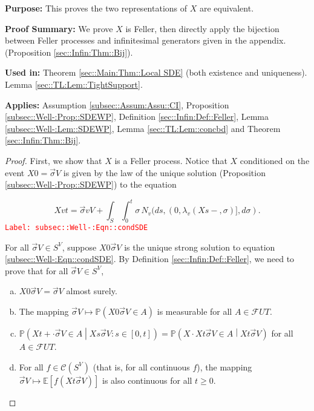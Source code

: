 \documentclass[12pt]{article}
\newcommand{\mb}{\mathbb}
\newcommand{\mc}{\mathcal}
\newcommand{\tr}{\textcolor{red}}
\newcommand{\labe}[1]{\tr{\texttt{Label: #1}}}
\newcommand{\purpose}{\textbf{Purpose: }}
\newcommand{\pfsum}{\textbf{Proof Summary: }}
\newcommand{\usein}{\textbf{Used in: }}
\newcommand{\app}{\textbf{Applies: }}
\newcommand{\pr}{\mb{P}}							%
\newcommand{\ex}[1]{\mb{E}\left[#1\right]}			%
\renewcommand{\v}{v}							%
\renewcommand{\U}{U}							%
\renewcommand{\S}{S}							%
\newcommand{\s}{\sigma}							%
\newcommand{\sv}{\vec{\s}}						%
\newcommand{\T}{T}								%
\renewcommand{\t}{t}							%
\renewcommand{\tt}{s}							%
\newcommand{\F}{\mc{F}}							%
\newcommand{\X}{X}								%
\newcommand{\poiss}[1]{N_{#1}}						%
\newcommand{\V}{V}									%
\newcommand{\XState}[1]{\S^{#1}}				%
\newcommand{\rate}[1]{\lambda_{#1}}					%
\newcommand{\cont}{\mc{C}}							%
\begin{document}
\purpose This proves the two representations of \(\X{}{}\) are equivalent.

\pfsum We prove \(\X{}{}\) is Feller, then directly apply the bijection between Feller processes and infinitesimal generators given in the appendix. (Proposition \ref{sec::Infin:Thm::Bij}).

\usein Theorem \ref{sec::Main:Thm::Local SDE} (both existence and uniqueness). Lemma \ref{sec::TL:Lem::TightSupport}.

\app Assumption \ref{subsec::Assum:Assu::CI}, Proposition \ref{subsec::Well-:Prop::SDEWP}, Definition \ref{sec::Infin:Def::Feller}, Lemma \ref{subsec::Well-:Lem::SDEWP}, Lemma \ref{sec::TL:Lem::concbd} and Theorem \ref{sec::Infin:Thm::Bij}.

\begin{proof}
First, we show that \(\X{}{}\) is a Feller process. Notice that \(\X{}{}\) conditioned on the event \(\X{}{0} = \sv{}{\V}\) is given by the law of the unique solution (Proposition \ref{subsec::Well-:Prop::SDEWP}) to the equation

\begin{equation}
\X{\v}{\t} = \sv{\v}{\V} + \int_\S\int_0^\t \s\,\poiss{\v}(d\tt,(0,\rate{\v}(\X{}{\tt-},\s)],d\s).
\label{subsec::Well-:Eqn::condSDE}
\end{equation}
\labe{subsec::Well-:Eqn::condSDE}

For all \(\sv{}{\V}\in\S^\V\), suppose \(\X{}{0}{\sv{}{\V}}\) is the unique strong solution to equation \eqref{subsec::Well-:Eqn::condSDE}. By Definition \ref{sec::Infin:Def::Feller}, we need to prove that for all \(\sv{}{\V}\in \S^\V\),

\begin{enumerate}[(a)]
\item \(\X{}{0}{\sv{}{\V}} = \sv{}{\V}\) almost surely.

\item The mapping \(\sv{}{\V}\mapsto \pr\left(\X{}{0}{\sv{}{\V}}\in A\right)\) is measurable for all \(A\in \F{\U}{\T}\).

\item \(\pr\left(\X{}{\t+\cdot}{\sv{}{\V}}\in A\middle|\X{}{\tt}{\sv{}{\V}}:\tt \in [0,\t]\right) = \pr\left(\X{}{\cdot}{\X{}{\t}{\sv{}{\V}}} \in A\middle| \X{}{\t}{\sv{}{\V}} \right)\) for all \(A \in \F{\U}{\T}\).

\item For all \(f \in \cont(\S^\V)\) (that is, for all continuous \(f\)), the mapping \(\sv{}{\V}\mapsto \ex{f(\X{}{\t}{\sv{}{\V}})}\) is also continuous for all \(t\geq 0\).
\end{enumerate}


\end{proof}
\end{document}
